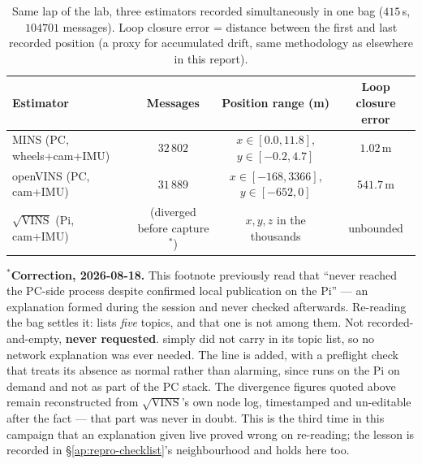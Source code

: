 \begin{table}[htbp]
\centering
\small
\caption{Same lap of the lab, three estimators recorded simultaneously
in one bag ($415$\,s, $104701$ messages). Loop closure error = distance
between the first and last recorded position (a proxy for accumulated
drift, same methodology as  elsewhere in this
report).}
\label{tab:sqrtvins_compare}
\begin{tabular}{@{}lccc@{}}
\toprule
Estimator & Messages & Position range (m) & Loop closure error \\
\midrule
MINS (PC, wheels+cam+IMU) & $32\,802$ & $x\in[0.0,11.8]$, $y\in[-0.2,4.7]$ & $\mathbf{1.02}\,\text{m}$ \\
openVINS (PC, cam+IMU) & $31\,889$ & $x\in[-168,3366]$, $y\in[-652,0]$ & $541.7\,\text{m}$ \\
$\sqrt{\text{VINS}}$ (Pi, cam+IMU) & (diverged before capture$^\ast$) & $x,y,z$ in the thousands & unbounded \\
\bottomrule
\end{tabular}
\end{table}
\noindent $^\ast$\textbf{Correction, 2026-08-18.} This footnote previously
read that  ``never reached the PC-side
 process despite confirmed local publication on the
Pi'' --- an explanation formed during the session and never checked
afterwards. Re-reading the bag settles it:  lists
\emph{five} topics, and that one is not among them. Not recorded-and-empty,
\textbf{never requested}.  simply did
not carry  in its topic list, so no network
explanation was ever needed. The line is added, with a preflight check that
treats its absence as normal rather than alarming, since 
runs on the Pi on demand and not as part of the PC stack. The divergence
figures quoted above remain reconstructed from
$\sqrt{\text{VINS}}$'s own node log, timestamped and un-editable after the
fact --- that part was never in doubt. This is the third time in this
campaign that an explanation given live proved wrong on re-reading; the
lesson is recorded in \S\ref{ap:repro-checklist}'s neighbourhood and holds
here too.

